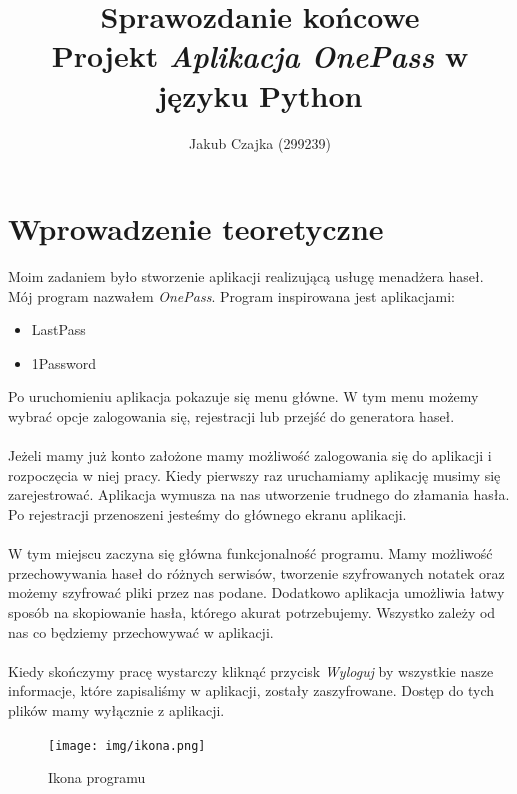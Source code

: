 \documentclass[a4paper]{article}
\title{Sprawozdanie końcowe \\ Projekt \textit{Aplikacja OnePass} w języku Python}
\author{Jakub Czajka (299239)}
\begin{document}
\maketitle
\tableofcontents
\thispagestyle{empty}
\newpage

\section{Wprowadzenie teoretyczne}
Moim zadaniem było stworzenie aplikacji realizującą usługę menadżera haseł. Mój program nazwałem \textit{OnePass}. Program inspirowana jest aplikacjami:
\begin{itemize}
    \item LastPass
    \item 1Password
\end{itemize}
Po uruchomieniu aplikacja pokazuje się menu główne. W tym menu możemy wybrać opcje zalogowania się, rejestracji lub przejść do generatora haseł.\\ \\
Jeżeli mamy już konto założone mamy możliwość zalogowania się do aplikacji i rozpoczęcia w niej pracy. Kiedy pierwszy raz uruchamiamy aplikację musimy się zarejestrować. Aplikacja wymusza na nas utworzenie trudnego do złamania hasła. Po rejestracji przenoszeni jesteśmy do głównego ekranu aplikacji.\\ \\
W tym miejscu zaczyna się główna funkcjonalność programu. Mamy możliwość przechowywania haseł do różnych serwisów, tworzenie szyfrowanych notatek oraz możemy szyfrować pliki przez nas podane. Dodatkowo aplikacja umożliwia łatwy sposób na skopiowanie hasła, którego akurat potrzebujemy. Wszystko zależy od nas co będziemy przechowywać w aplikacji.\\ \\
Kiedy skończymy pracę wystarczy kliknąć przycisk \textit{Wyloguj} by wszystkie nasze informacje, które zapisaliśmy w aplikacji, zostały zaszyfrowane. Dostęp do tych plików mamy wyłącznie z aplikacji.
\\
\begin{figure}[H]
    \centering
    \texttt{[image: img/ikona.png]}
    \caption{Ikona programu}
    \label{fig:ikona}
\end{figure}
\end{document}
